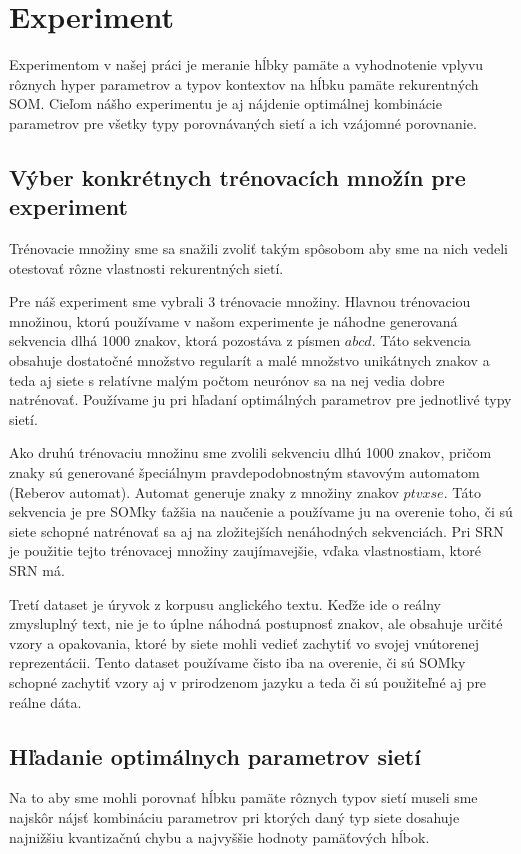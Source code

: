 \chapter{Experiment}

Experimentom v našej práci je meranie hĺbky pamäte a vyhodnotenie vplyvu rôznych
hyper parametrov a typov kontextov na hĺbku pamäte rekurentných SOM.
Cieľom nášho experimentu je aj nájdenie 
optimálnej kombinácie parametrov pre všetky typy porovnávaných sietí a ich vzájomné porovnanie.

\section{Výber konkrétnych trénovacích množín pre experiment}
Trénovacie množiny sme sa snažili zvoliť
takým spôsobom aby sme na nich vedeli otestovať rôzne vlastnosti rekurentných sietí.

Pre náš experiment sme vybrali 3 trénovacie množiny.
Hlavnou trénovaciou množinou, ktorú používame v našom experimente je náhodne generovaná 
sekvencia dlhá 1000 znakov, ktorá pozostáva z písmen $abcd$.
Táto sekvencia obsahuje dostatočné množstvo regularít a malé množstvo unikátnych znakov a teda
aj siete s relatívne malým počtom neurónov sa na nej vedia dobre natrénovať.
Používame ju pri hľadaní optimálných parametrov pre jednotlivé typy sietí.

Ako druhú trénovaciu množinu sme zvolili sekvenciu dlhú 1000 znakov, pričom znaky sú generované
špeciálnym pravdepodobnostným stavovým automatom (Reberov automat). Automat generuje znaky z množiny znakov $ptvxse$.
Táto sekvencia je pre SOMky ťažšia na naučenie a používame ju na overenie toho, či sú siete schopné natrénovať sa aj
na zložitejších nenáhodných sekvenciách. Pri SRN je použitie tejto trénovacej množiny zaujímavejšie,
vďaka vlastnostiam, ktoré SRN má.

Tretí dataset je úryvok z korpusu anglického textu.
Keďže ide o reálny zmysluplný text, nie je to úplne náhodná postupnosť znakov, ale obsahuje určité vzory a opakovania, ktoré by siete mohli vedieť zachytiť
vo svojej vnútorenej reprezentácii.
Tento dataset používame čisto iba na overenie, či 
sú SOMky schopné zachytiť vzory aj v prirodzenom jazyku a teda či sú použiteľné aj pre 
reálne dáta.

\section{Hľadanie optimálnych parametrov sietí}
Na to aby sme mohli porovnať hĺbku pamäte rôznych typov sietí museli sme najskôr
nájsť kombináciu parametrov pri ktorých daný typ siete dosahuje najnižšiu kvantizačnú chybu a 
najvyššie hodnoty pamäťových hĺbok. 

